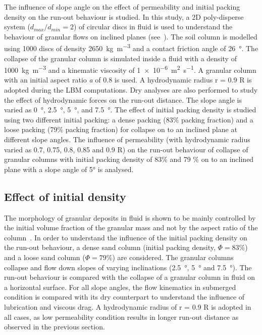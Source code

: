 The influence of slope angle on the effect of permeability and initial packing 
density on the run-out behaviour is studied. In this study, a 2D poly-disperse 
system ($d_{max}/d_{min} = 2$) of circular discs in fluid is used to understand 
the behaviour of granular flows on inclined planes (see~). The 
soil column is modelled using 1000 discs of density 
\SI{2650}{\kg\per\cubic\meter} and a contact friction angle of 
\SI{26}{\degree}. The collapse of the granular column is simulated inside a 
fluid with a density of \SI{1000}{\kg\per\cubic\meter} and a kinematic 
viscosity of \SI{1e-6}{\square\meter\per\second}. A granular column with an 
initial aspect ratio \textit{a} of 0.8 is used. A hydrodynamic radius r = 0.9 R 
is adopted during the LBM computations. Dry analyses are also performed to 
study the effect of hydrodynamic forces on the run-out distance. The slope 
angle is varied as \SI{0}{\degree}, \SI{2.5}{\degree}, \SI{5}{\degree}, and 
\SI{7.5}{\degree}. The effect of initial packing density is studied using two 
different initial packing: a dense packing (83\% packing fraction) and a loose 
packing (79\% packing fraction) for collapse on to an inclined plane at 
different slope angles. The influence of permeability (with hydrodynamic radius 
varied as 0.7, 0.75, 0.8, 0.85 and 0.9 R) on the run-out behaviour of collapse 
of granular columns with initial packing density of 83\% and 79 \% on to an 
inclined plane with a slope angle of 5\si{\degree} is analysed.


\subsection{Effect of initial density}
The morphology of granular deposits in fluid is shown to be mainly 
controlled by the initial volume fraction of the granular mass and not by the 
aspect ratio of the column~\citep{Rondon2011,Pailha2008}. In order to 
understand the influence of the initial packing density on the run-out 
behaviour, a dense sand column (initial packing density, $\Phi=83\%$) and a 
loose sand column ($\Phi=79\%$) are considered. The granular columns collapse 
and flow down slopes of varying inclinations (\SI{2.5}{\degree}, 
\SI{5}{\degree} and \SI{7.5}{\degree}). The run-out behaviour is compared with 
the collapse of a granular column in fluid on a horizontal surface. For all 
slope angles, the flow kinematics in submerged condition is compared with its 
dry counterpart to understand the influence of lubrication and viscous drag. A 
hydrodynamic radius of r = 0.9 R is adopted in all cases, as low permeability 
condition results in longer run-out distance as observed in the previous 
section.


